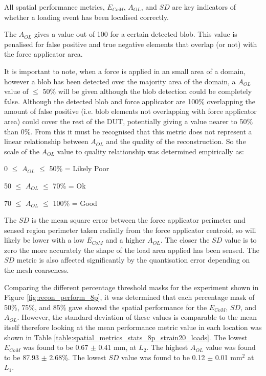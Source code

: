 All spatial performance metrics, $E_{CoM}$, $A_{OL}$, and $S\!D$ are key indicators of whether a loading event has been localised correctly.



The $A_{OL}$ gives a value out of 100 for a certain detected blob. This value is penalised for false positive and true negative elements that overlap (or not) with the force applicator area.

It is important to note, when a force is applied in an small area of a domain, however a blob has been detected over the majority area of the domain, a $A_{OL}$ value of $\leq$ 50\% will be given although the blob detection could be completely false. Although the detected blob and force applicator are 100\% overlapping the amount of false positive (i.e. blob elements not overlapping with force applicator area) could cover the rest of the DUT, potentially giving a value nearer to 50\% than 0\%. From this it must be recognised that this metric does not represent a linear relationship between $A_{OL}$ and the quality of the reconstruction. So the scale of the $A_{OL}$ value to quality relationship was determined empirically as:
\vspace{-0.4cm}
\begin{center}
    \item 0 $\leq$ $A_{OL}$ $\leq$ 50\% = Likely Poor
    \item 50 $\leq$ $A_{OL}$ $\leq$ 70\% = Ok
    \item 70 $\leq$ $A_{OL}$ $\leq$ 100\% = Good
\end{center}

The $S\!D$ is the mean square error between the force applicator perimeter and sensed region perimeter taken radially from the force applicator centroid, so will likely be lower with a low $E_{CoM}$ and a higher $A_{OL}$. The closer the $S\!D$ value is to zero the more accurately the shape of the load area applied has been sensed. The $S\!D$ metric is also affected significantly by the quantisation error depending on the mesh coarseness.

Comparing the different percentage threshold masks for the experiment shown in Figure \ref{fig:recon_perform_8p}, it was determined that each percentage mask of 50\%, 75\%, and 85\% gave showed the spatial performance for the $E_{CoM}$, $S\!D$, and $A_{OL}$. However, the standard deviation of these values is comparable to the mean itself therefore looking at the mean performance metric value in each location was shown in Table \ref{table:spatial_metrics_stats_8p_strain20_loads}. The lowest $E_{CoM}$ was found to be 0.67 $\pm$ 0.41 mm, at $L_2$. The highest $A_{OL}$ value was found to be 87.93 $\pm$ 2.68\%. The lowest $S\!D$ value was found to be 0.12 $\pm$ 0.01 mm$^2$ at $L_1$.

